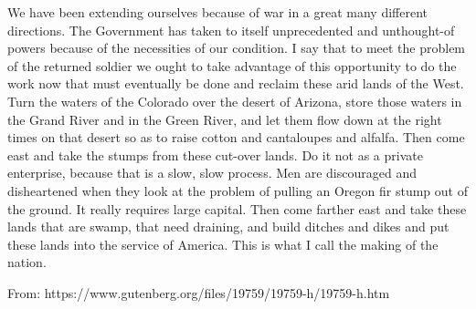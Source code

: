\begin{linenumbers*}
\indent We have been extending ourselves because of war in a great many different directions. The Government has taken to itself unprecedented and unthought-of powers because of the necessities of our condition. I say that to meet the problem of the returned soldier we ought to take advantage of this opportunity to do the work now that must eventually be done and reclaim these arid lands of the West. Turn the waters of the Colorado over the desert of Arizona, store those waters in the Grand River and in the Green River, and let them flow down at the right times on that desert so as to raise cotton and cantaloupes and alfalfa. Then come east and take the stumps from these cut-over lands. Do it not as a private enterprise, because that is a slow, slow process. Men are discouraged and disheartened when they look at the problem of pulling an Oregon fir stump out of the ground. It really requires large capital. Then come farther east and take these lands that are swamp, that need draining, and build ditches and dikes and put these lands into the service of America. This is what I call the making of the nation.
\end{linenumbers*}

From: https://www.gutenberg.org/files/19759/19759-h/19759-h.htm

